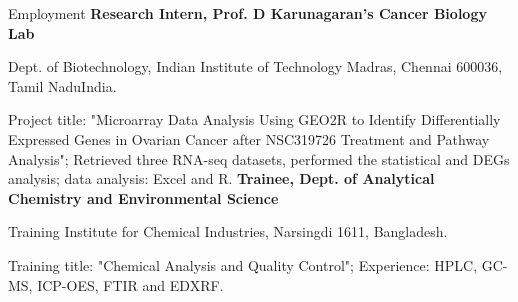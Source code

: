 \begin{rubric}{Employment}
    \entry*[2020]%
        \textbf{Research Intern, Prof. D Karunagaran's Cancer Biology Lab}\par Dept. of Biotechnology, Indian Institute of Technology Madras, Chennai 600036, Tamil NaduIndia.\par
        Project title: "Microarray Data Analysis Using GEO2R to Identify Differentially Expressed Genes in Ovarian Cancer after NSC319726 Treatment and Pathway Analysis"; Retrieved three RNA-seq datasets, performed the statistical and DEGs analysis; data analysis: Excel and R.
    \entry*[2019]%
        \textbf{Trainee, Dept. of Analytical Chemistry and Environmental Science} \par
        Training Institute for Chemical Industries, Narsingdi 1611, Bangladesh.\par
        Training title: "Chemical Analysis and Quality Control"; Experience: HPLC, GC-MS, ICP-OES, FTIR and EDXRF.
    \end{rubric}